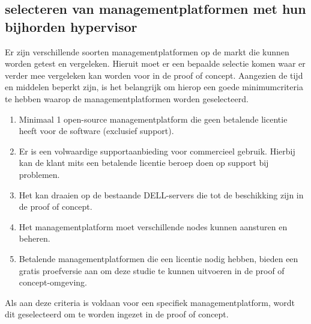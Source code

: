 \subsection{selecteren van managementplatformen met hun bijhorden hypervisor}
Er zijn verschillende soorten managementplatformen op de markt die kunnen worden getest en vergeleken. Hieruit moet er een bepaalde selectie komen waar er verder mee vergeleken kan worden voor in de proof of concept.
Aangezien de tijd en middelen beperkt zijn, is het belangrijk om hierop een goede minimumcriteria te hebben waarop de managementplatformen worden geselecteerd.

\begin{enumerate}
\item Minimaal 1 open-source managementplatform die geen betalende licentie heeft voor de software (exclusief support).
\item Er is een volwaardige supportaanbieding voor commercieel gebruik. Hierbij kan de klant mits een betalende licentie beroep doen op support bij problemen.
\item Het kan draaien op de bestaande DELL-servers die tot de beschikking zijn in de proof of concept.
\item Het managementplatform moet verschillende nodes kunnen aansturen en beheren.
\item Betalende managementplatformen die een licentie nodig hebben, bieden een gratis proefversie aan om deze studie te kunnen uitvoeren in de proof of concept-omgeving.
\end{enumerate}
Als aan deze criteria is voldaan voor een specifiek managementplatform, wordt dit geselecteerd om te worden ingezet in de proof of concept.


